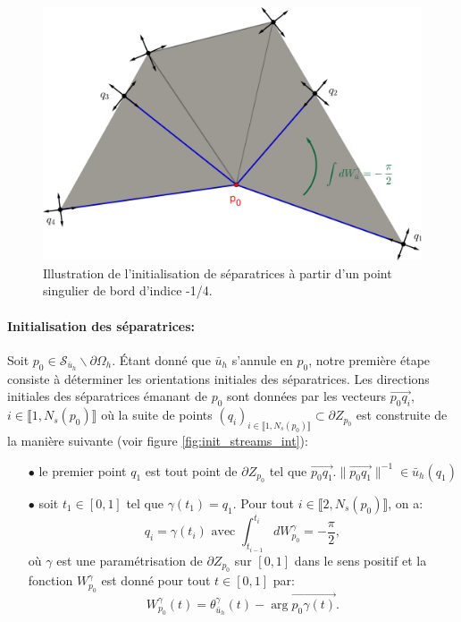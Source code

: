 \begin{figure}[!h]
\centering
\includegraphics[scale=0.755]{images/triangle separatrices bord.png}
\caption{Illustration de l'initialisation de séparatrices à partir d'un point singulier de bord d'indice -1/4.}
\label{fig:init_streams_bord}
\end{figure}

\paragraph{Initialisation des séparatrices:}

Soit $p_0\in\mathcal{S}_{\bar{u}_h}\backslash\partial\Omega_h$. Étant donné que $\bar{u}_h$ s'annule en $p_0$, notre première étape consiste à déterminer les orientations initiales des séparatrices. Les directions initiales des séparatrices émanant de $p_0$ sont données par les vecteurs $\overrightarrow{p_0q_i}$, $i\in\llbracket 1, N_s(p_0) \rrbracket$ où la suite de points $(q_i)_{i\in\llbracket 1, N_s(p_0)\rrbracket}\subset\partial Z_{p_0}$ est construite de la manière suivante (voir figure \ref{fig:init_streams_int}):\\
\begin{itemize}
    \item[$\bullet$] le premier point $q_1$ est tout point de $\partial Z_{p_0}$ tel que $\overrightarrow{p_0q_1}.\|\overrightarrow{p_0q_1}\|^{-1}\in\bar{u}_h(q_1)$\\
    \item[$\bullet$] soit $t_1\in[0, 1]$ tel que $\gamma(t_1)=q_1$. Pour tout $i\in\llbracket 2, N_s(p_0)\rrbracket$, on a:
    $$
    q_i=\gamma(t_i)\mbox{ avec }\int_{t_{i-1}}^{t_i}dW_{p_0}^\gamma=-\frac{\pi}{2},
    $$
    où $\gamma$ est une paramétrisation de $\partial Z_{p_0}$ sur $[0, 1]$ dans le sens positif et la fonction $W^\gamma_{p_0}$ est donné pour tout $t\in[0, 1]$ par:
    $$
    W_{p_0}^\gamma(t)=\theta^\gamma_{\bar{u}_h}(t)-\arg \overrightarrow{p_0\gamma(t)}.
    $$
\end{itemize}


